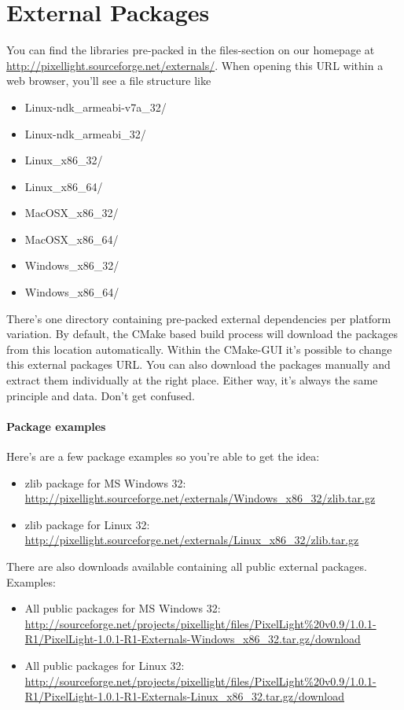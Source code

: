 \section{External Packages}
You can find the libraries pre-packed in the files-section on our homepage at \url{http://pixellight.sourceforge.net/externals/}. When opening this \ac{URL} within a web browser, you'll see a file structure like
\begin{itemize}
\item{Linux-ndk\_armeabi-v7a\_32/}
\item{Linux-ndk\_armeabi\_32/}
\item{Linux\_x86\_32/}
\item{Linux\_x86\_64/}
\item{MacOSX\_x86\_32/}
\item{MacOSX\_x86\_64/}
\item{Windows\_x86\_32/}
\item{Windows\_x86\_64/}
\end{itemize}
There's one directory containing pre-packed external dependencies per platform variation. By default, the CMake based build process will download the packages from this location automatically. Within the CMake-GUI it's possible to change this external packages \ac{URL}. You can also download the packages manually and extract them individually at the right place. Either way, it's always the same principle and data. Don't get confused.


\paragraph{Package examples}
Here's are a few package examples so you're able to get the idea:
\begin{itemize}
\item{zlib package for \ac{MS} Windows \SI{32}{\bit}: \url{http://pixellight.sourceforge.net/externals/Windows_x86_32/zlib.tar.gz}}
\item{zlib package for Linux \SI{32}{\bit}: \url{http://pixellight.sourceforge.net/externals/Linux_x86_32/zlib.tar.gz}}
\end{itemize}

There are also downloads available containing all public external packages. Examples:
\begin{itemize}
\item{All public packages for \ac{MS} Windows \SI{32}{\bit}: \url{http://sourceforge.net/projects/pixellight/files/PixelLight%20v0.9/1.0.1-R1/PixelLight-1.0.1-R1-Externals-Windows_x86_32.tar.gz/download}}
\item{All public packages for Linux \SI{32}{\bit}: \url{http://sourceforge.net/projects/pixellight/files/PixelLight%20v0.9/1.0.1-R1/PixelLight-1.0.1-R1-Externals-Linux_x86_32.tar.gz/download}}
\end{itemize}


